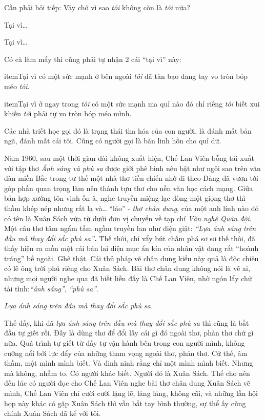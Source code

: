 \documentclass[../main.tex]{subfiles}
\begin{document}
\begin{multicols}{2}
Cần phải hỏi tiếp: Vậy chớ vì sao \textit{tôi} không còn là \textit{tôi} nữa?  
	 
Tại vì… 
	 
Tại vì… 
	  
Có cà lăm mấy thì cũng phải tự nhận 2 cái “tại vì” này: 
\begin{itemize}

item{Tại vì có một sức mạnh ở bên ngoài \textit{tôi} đã tàn bạo đang tay vo tròn bóp méo \textit{tôi}. }

item{Tại vì ở ngay trong \textit{tôi }có một sức mạnh ma quỉ nào đó chỉ riêng \textit{tôi} biết xui khiến \textit{tô}i phải tự vo tròn bóp méo mình. }

\end{itemize}
 Các nhà triết học gọi đó là trạng thái tha hóa của con người, là đánh mất bản ngã, đánh mất cái tôi. Cũng có người gọi là bán linh hồn cho quỉ dữ. 
 
Năm 1960, sau một thời gian dài không xuất hiện, Chế Lan Viên bỗng tái xuất với tập thơ \textit{Ánh sáng và phù sa }được giới phê bình nêu bật như ngôi sao trên văn đàn miền Bắc trong tư thế một nhà thơ tiền chiến nhờ đi theo Đảng đã vươn tới góp phần quan trọng làm nên thành tựu thơ cho nền văn học cách mạng. Giữa bản hợp xướng tôn vinh ồn ã, nghe truyền miệng lạc dòng một giọng thơ thì thầm khép nép nhưng rất lạ và… “láo” - \textit{thơ chân dung}, của một anh lính nào đó có tên là Xuân Sách vừa từ dưới đơn vị chuyển về tạp chí \textit{Văn nghệ Quân đội}. Một câu thơ tâm ngẩm tầm ngầm truyền lan như điện giật: \textit{“Lựa ánh sáng trên đầu mà thay đổi sắc phù sa”\textbf{.}} Thế thôi, chỉ vẩy bút chấm phá sơ sơ thế thôi, đã thấy hiện ra mồn một cái bản lai diện mục ẩn kín của nhân vật đang rất “hoành tráng” bề ngoài. Ghê thật. Cái thủ pháp vẽ chân dung kiểu này quả là độc chiêu có lẽ ông trời phú riêng cho Xuân Sách. Bài thơ chân dung không nói là vẽ ai, nhưng mọi người nghe qua đã biết liền đấy là Chế Lan Viên, nhờ ngón lẩy chữ tài tình:\textit{“ánh sáng”}, \textit{“phù sa”}.  
\begin{blockquote}
 
\textit{Lựa ánh sáng trên đầu mà thay đổi sắc phù sa.} 

\end{blockquote}
 
Thế đấy, khi đã \textit{lựa ánh sáng trên đầu mà thay đổi sắc phù sa} thì cũng là bắt đầu tự giết rồi. Đấy là dùng thơ để đổi lấy cái gì đó ngoài thơ, phản thơ chứ gì nữa. Quá trình tự giết từ đấy tự vận hành bên trong con người mình, không cưỡng nổi bởi lực đẩy của những tham vọng ngoài thơ, phản thơ. Cứ thế, âm thầm, một mình mình biết. Và đinh ninh rằng chỉ một mình mình biết. Nhưng mà không, nhầm to. Có người khác biết. Người đó là Xuân Sách. Thế cho nên đến lúc có người đọc cho Chế Lan Viên nghe bài thơ chân dung Xuân Sách vẽ mình, Chế Lan Viên chỉ cười cười lặng lẽ, lảng lảng, không cãi, và những lần hội họp này khác có gặp Xuân Sách thì vẫn bắt tay bình thường, sự thể ấy cũng chính Xuân Sách đã kể với tôi. 
 

\end{multicols}
\end{document}
